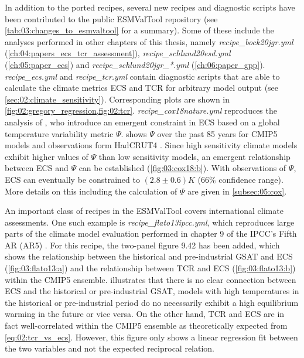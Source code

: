 In addition to the ported recipes, several new recipes and diagnostic scripts
have been contributed to the public \ac{ESMValTool} repository (see
\cref{tab:03:changes_to_esmvaltool} for a summary). Some of these include the
analyses performed in other chapters of this thesis, namely
\emph{recipe\_bock20jgr.yml} (\cref{ch:04:papers_ecs_tcr_assessment}),
\emph{recipe\_schlund20esd.yml} (\cref{ch:05:paper_ecs}) and
\emph{recipe\_schlund20jgr\_*.yml} (\cref{ch:06:paper_gpp}).
\emph{recipe\_ecs.yml} and \emph{recipe\_tcr.yml} contain diagnostic scripts
that are able to calculate the climate metrics \ac{ECS} and \ac{TCR} for
arbitrary model output (see \cref{sec:02:climate_sensitivity}). Corresponding
plots are shown in \cref{fig:02:gregory_regression,fig:02:tcr}.
\emph{recipe\_cox18nature.yml} reproduces the analysis of \textcite{Cox2018},
who introduce an emergent constraint in \ac{ECS} based on a global temperature
variability metric $\Psi$.  shows $\Psi$ over the past 85
years for \acs{CMIP}5 models and observations form HadCRUT4
\autocite{Morice2012}. Since high sensitivity climate models exhibit higher
values of $\Psi$ than low sensitivity models, an emergent relationship between
\ac{ECS} and $\Psi$ can be established (\cref{fig:03:cox18:b}). With
observations of $\Psi$, \ac{ECS} can eventually be constrained to $\left( 2.8
\pm 0.6 \right) \unit{K}$ ($66 \unit{\%}$ confidence range). More details on
this including the calculation of $\Psi$ are given in \cref{subsec:05:cox}.

An important class of recipes in the \ac{ESMValTool} covers international
climate assessments. One such example is \emph{recipe\_flato13ipcc.yml}, which
reproduces large parts of the climate model evaluation performed in chapter 9
of the \ac{IPCC}'s Fifth \acl{AR} (\acs{AR}5) \autocite{Flato2013}. For this
recipe, the two-panel figure 9.42 has been added, which shows the relationship
between the historical and pre-industrial \ac{GSAT} and \ac{ECS}
(\cref{fig:03:flato13:a}) and the relationship between \ac{TCR} and \ac{ECS}
(\cref{fig:03:flato13:b}) within the \acs{CMIP}5 ensemble.
 illustrates that there is no clear connection between
\ac{ECS} and the historical or pre-industrial \ac{GSAT}, \ie{} models with high
temperatures in the historical or pre-industrial period do no necessarily
exhibit a high equilibrium warming in the future or vice versa. On the other
hand, \ac{TCR} and \ac{ECS} are in fact well-correlated within the \acs{CMIP}5
ensemble as theoretically expected from \cref{eq:02:tcr_vs_ecs}. However, this
figure only shows a linear regression fit between the two variables and not the
expected reciprocal relation.

